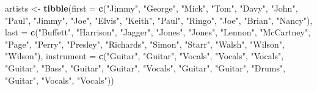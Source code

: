 \documentclass[
]{book}
\newenvironment{Shaded}{\begin{snugshade}}{\end{snugshade}}
\newcommand{\AttributeTok}[1]{\textcolor[rgb]{0.13,0.29,0.53}{#1}}
\newcommand{\FunctionTok}[1]{\textcolor[rgb]{0.13,0.29,0.53}{\textbf{#1}}}
\newcommand{\NormalTok}[1]{#1}
\newcommand{\OtherTok}[1]{\textcolor[rgb]{0.56,0.35,0.01}{#1}}
\newcommand{\StringTok}[1]{\textcolor[rgb]{0.31,0.60,0.02}{#1}}
\begin{document}
\begin{Shaded}
\begin{Highlighting}[]
\NormalTok{artists }\OtherTok{\textless{}{-}} \FunctionTok{tibble}\NormalTok{(}\AttributeTok{first =} \FunctionTok{c}\NormalTok{(}\StringTok{"Jimmy"}\NormalTok{, }\StringTok{"George"}\NormalTok{, }\StringTok{"Mick"}\NormalTok{, }\StringTok{"Tom"}\NormalTok{, }\StringTok{"Davy"}\NormalTok{, }\StringTok{"John"}\NormalTok{,}
                            \StringTok{"Paul"}\NormalTok{, }\StringTok{"Jimmy"}\NormalTok{, }\StringTok{"Joe"}\NormalTok{, }\StringTok{"Elvis"}\NormalTok{, }\StringTok{"Keith"}\NormalTok{, }\StringTok{"Paul"}\NormalTok{, }
                            \StringTok{"Ringo"}\NormalTok{, }\StringTok{"Joe"}\NormalTok{, }\StringTok{"Brian"}\NormalTok{, }\StringTok{"Nancy"}\NormalTok{), }
                  \AttributeTok{last =} \FunctionTok{c}\NormalTok{(}\StringTok{"Buffett"}\NormalTok{, }\StringTok{"Harrison"}\NormalTok{, }\StringTok{"Jagger"}\NormalTok{, }\StringTok{"Jones"}\NormalTok{, }\StringTok{"Jones"}\NormalTok{, }
                           \StringTok{"Lennon"}\NormalTok{, }\StringTok{"McCartney"}\NormalTok{, }\StringTok{"Page"}\NormalTok{, }\StringTok{"Perry"}\NormalTok{, }\StringTok{"Presley"}\NormalTok{,}
                           \StringTok{"Richards"}\NormalTok{, }\StringTok{"Simon"}\NormalTok{, }\StringTok{"Starr"}\NormalTok{, }\StringTok{"Walsh"}\NormalTok{, }\StringTok{"Wilson"}\NormalTok{, }\StringTok{"Wilson"}\NormalTok{), }
                  \AttributeTok{instrument =} \FunctionTok{c}\NormalTok{(}\StringTok{"Guitar"}\NormalTok{, }\StringTok{"Guitar"}\NormalTok{, }\StringTok{"Vocals"}\NormalTok{, }\StringTok{"Vocals"}\NormalTok{, }\StringTok{"Vocals"}\NormalTok{,}
                                 \StringTok{"Guitar"}\NormalTok{, }\StringTok{"Bass"}\NormalTok{, }\StringTok{"Guitar"}\NormalTok{, }\StringTok{"Guitar"}\NormalTok{, }\StringTok{"Vocals"}\NormalTok{, }\StringTok{"Guitar"}\NormalTok{, }
                                 \StringTok{"Guitar"}\NormalTok{, }\StringTok{"Drums"}\NormalTok{, }\StringTok{"Guitar"}\NormalTok{, }\StringTok{"Vocals"}\NormalTok{, }\StringTok{"Vocals"}\NormalTok{))}



\end{Highlighting}
\end{Shaded}
\end{document}

